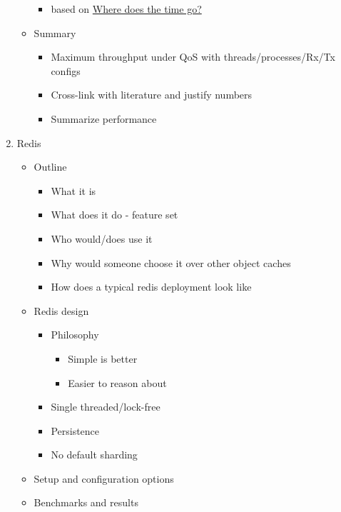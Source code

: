 \begin{enumerate}
\begin{itemize}
    \begin{itemize}
    \tightlist
    \item
      based on
      \href{http://ieeexplore.ieee.org/stamp/stamp.jsp?tp=\&arnumber=7095781}{Where
      does the time go?}
    \end{itemize}
  \item
    Summary

    \begin{itemize}
    \tightlist
    \item
      Maximum throughput under QoS with threads/processes/Rx/Tx configs
    \item
      Cross-link with literature and justify numbers
    \item
      Summarize performance
    \end{itemize}
  \end{itemize}
\item
  Redis

  \begin{itemize}
  \tightlist
  \item
    Outline

    \begin{itemize}
    \tightlist
    \item
      What it is
    \item
      What does it do - feature set
    \item
      Who would/does use it
    \item
      Why would someone choose it over other object caches
    \item
      How does a typical redis deployment look like
    \end{itemize}
  \item
    Redis design

    \begin{itemize}
    \tightlist
    \item
      Philosophy

      \begin{itemize}
      \tightlist
      \item
        Simple is better
      \item
        Easier to reason about
      \end{itemize}
    \item
      Single threaded/lock-free
    \item
      Persistence
    \item
      No default sharding
    \end{itemize}
  \item
    Setup and configuration options
  \item
    Benchmarks and results


\end{itemize}
\end{enumerate}
